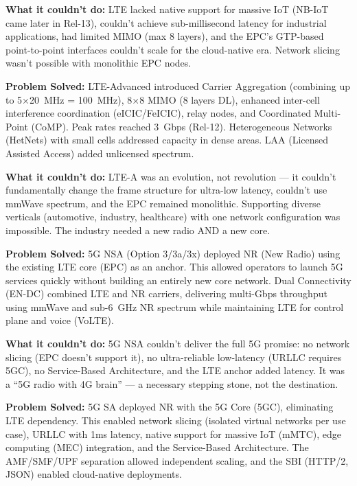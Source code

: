 \textbf{What it couldn’t do:} LTE lacked native support for massive IoT (NB-IoT came later in Rel-13), couldn’t achieve sub-millisecond latency for industrial applications, had limited MIMO (max 8 layers), and the EPC’s GTP-based point-to-point interfaces couldn’t scale for the cloud-native era. Network slicing wasn’t possible with monolithic EPC nodes.


\textbf{Problem Solved:} LTE-Advanced introduced Carrier Aggregation (combining up to 5\ensuremath{\times}20~MHz = 100~MHz), 8\ensuremath{\times}8 MIMO (8 layers DL), enhanced inter-cell interference coordination (eICIC/\allowbreak{}FeICIC), relay nodes, and Coordinated Multi-Point (CoMP). Peak rates reached 3~Gbps (Rel-12). Heterogeneous Networks (HetNets) with small cells addressed capacity in dense areas. LAA (Licensed Assisted Access) added unlicensed spectrum.

\textbf{What it couldn’t do:} LTE-A was an evolution, not revolution — it couldn’t fundamentally change the frame structure for ultra-low latency, couldn’t use mmWave spectrum, and the EPC remained monolithic. Supporting diverse verticals (automotive, industry, healthcare) with one network configuration was impossible. The industry needed a new radio AND a new core.


\textbf{Problem Solved:} 5G NSA (Option 3/\allowbreak{}3a/\allowbreak{}3x) deployed NR (New Radio) using the existing LTE core (EPC) as an anchor. This allowed operators to launch 5G services quickly without building an entirely new core network. Dual Connectivity (EN-DC) combined LTE and NR carriers, delivering multi-Gbps throughput using mmWave and sub-6~GHz NR spectrum while maintaining LTE for control plane and voice (VoLTE).

\textbf{What it couldn’t do:} 5G NSA couldn’t deliver the full 5G promise: no network slicing (EPC doesn’t support it), no ultra-reliable low-latency (URLLC requires 5GC), no Service-Based Architecture, and the LTE anchor added latency. It was a ``5G radio with 4G brain'' — a necessary stepping stone, not the destination.


\textbf{Problem Solved:} 5G SA deployed NR with the 5G Core (5GC), eliminating LTE dependency. This enabled network slicing (isolated virtual networks per use case), URLLC with 1ms latency, native support for massive IoT (mMTC), edge computing (MEC) integration, and the Service-Based Architecture. The AMF/\allowbreak{}SMF/\allowbreak{}UPF separation allowed independent scaling, and the SBI (HTTP/\allowbreak{}2, JSON) enabled cloud-native deployments.

